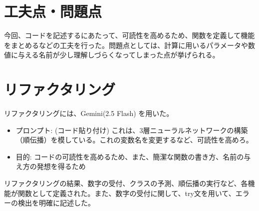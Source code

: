 \documentclass[11px,a4,dvipdfmx]{jsarticle}
\begin{document}
\section{工夫点・問題点}
今回、コードを記述するにあたって、可読性を高めるため、関数を定義して機能をまとめるなどの工夫を行った。問題点としては、計算に用いるパラメータや数値に与える名前が少し理解しづらくなってしまった点が挙げられる。
\section{リファクタリング}
リファクタリングには、Gemini(2.5 Flash) を用いた。
\begin{itemize}
    \item プロンプト: (コード貼り付け) これは、3層ニューラルネットワークの構築（順伝播）を模している。これの変数名を変更するなど、可読性を高めろ。
    \item 目的: コードの可読性を高めるため、また、簡潔な関数の書き方、名前の与え方の発想を得るため
\end{itemize}
リファクタリングの結果、数字の受付、クラスの予測、順伝播の実行など、各機能が関数として定義された。また、数字の受付に関して、try文を用いて、エラーの検出を明確に記述した。
\end{document}
